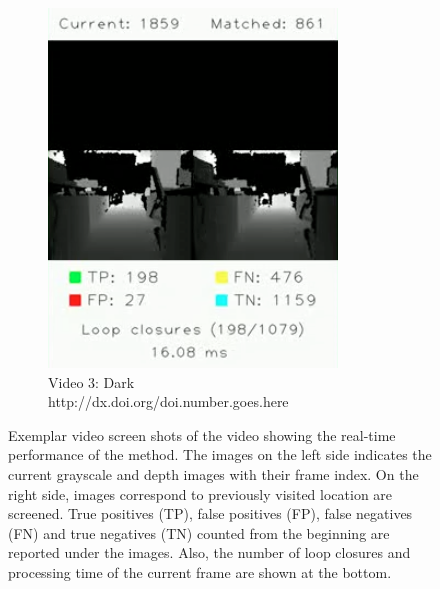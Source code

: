 \documentclass[]{spie}  %
\begin{document}
\begin{figure}
\begin{subfigure}[b]{0.32\textwidth}
        \includegraphics[trim = 0mm 0mm 0mm 0mm, clip, width=\textwidth]{figures/video_dark.png}    
        \caption{Video 3: Dark\vspace{1mm}\\\scriptsize{http://dx.doi.org/doi.number.goes.here}}
        \label{subfig:video_dark}
        \end{subfigure}
        
        \hspace{-2mm}
        \caption{Exemplar video screen shots of the video showing the real-time performance of the method. The images on the left side indicates the current grayscale and depth images with their frame index. On the right side, images correspond to previously visited location are screened. True positives (TP), false positives (FP), false negatives (FN) and true negatives (TN) counted from the beginning are reported under the images. Also, the number of loop closures and processing time of the current frame are shown at the bottom.}
        \label{fig:videos}
\end{figure}




 
\end{document}
